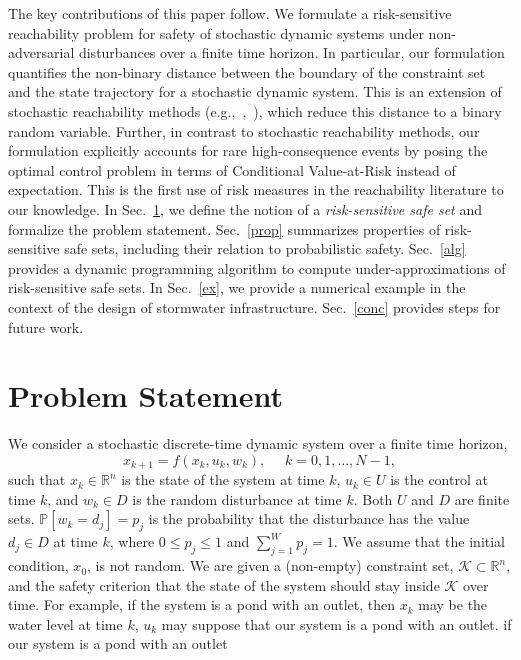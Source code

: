 \documentclass[letterpaper, 10 pt, conference]{ieeeconf}  %
\begin{document}
The key contributions of this paper follow.
We formulate a risk-sensitive reachability problem for safety of stochastic dynamic systems under non-adversarial disturbances
over a finite time horizon. In particular, our formulation quantifies the non-binary distance between the boundary of the constraint set and the
state trajectory for a stochastic dynamic system. This is an extension of stochastic 
reachability methods (e.g.,~\cite{abate2008probabilistic},~\cite{summers2010verification}), which reduce this distance to a binary random variable.
Further, in contrast to stochastic reachability methods, our formulation explicitly accounts for rare high-consequence events by posing the optimal control problem
in terms of Conditional Value-at-Risk instead of expectation. This is the first use of risk measures in the reachability literature to our knowledge.
In Sec.~\ref{problem}, we define the notion of a \textit{risk-sensitive safe set} and formalize the problem statement.
Sec.~\ref{prop} summarizes properties of risk-sensitive safe sets, including their relation to probabilistic safety.
Sec.~\ref{alg} provides a dynamic programming algorithm to compute under-approximations of risk-sensitive safe sets. %
In Sec.~\ref{ex}, we provide a numerical example in the context of the design of stormwater infrastructure. Sec.~\ref{conc} provides steps for future work.

\section{Problem Statement}\label{problem}
We consider a stochastic discrete-time dynamic system over a finite time horizon,\footnotemark
{}
\begin{equation}
x_{k+1} = f(x_k,u_k,w_k), \text{ }\text{ } k = 0, 1, \dots, N-1,
\label{sys}\end{equation}
such that $x_k \in \mathbb{R}^n$ is the state of the system at time $k$,
$u_k \in U$ is the control at time $k$, and
$w_k \in D$ is the random disturbance at time $k$. Both $U$ and $D$ are finite sets.
$\mathbb{P}[w_k = d_j] = p_j$ 
is the probability that the disturbance has the value $d_j \in D$ at time $k$, where $0 \leq p_j \leq 1$ and $\sum_{j=1}^W p_j = 1$.\footnotemark
{}  
We assume that the initial condition, $x_0$, is not random.
We are given a (non-empty) constraint set, $\mathcal{K} \subset \mathbb{R}^n$, and the safety criterion that 
the state of the system should stay inside $\mathcal{K}$ over time. 
For example, if the system is a pond with an outlet, then $x_k$ may be the water level at time $k$,
$u_k$ may  suppose that our system is a pond with an outlet. if our system is a pond with an outlet
\end{document}
